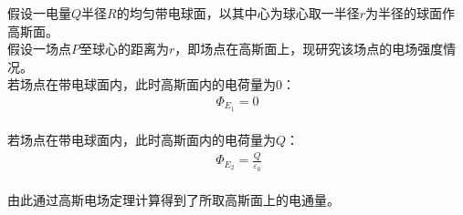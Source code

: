 \documentclass[UTF8]{ctexart}
\begin{document}
    假设一电量$Q$半径$R$的均匀带电球面，以其中心为球心取一半径$r$为半径的球面作高斯面。\\[3mm]
    假设一场点$P$至球心的距离为$r$，即场点在高斯面上，现研究该场点的电场强度情况。\\[6mm]
    若场点在带电球面内，此时高斯面内的电荷量为$0$：
    \begin{align}
        \Phi_{E_1}=0
    \end{align}\\
    若场点在带电球面内，此时高斯面内的电荷量为$Q$：\vspace{5pt}
    \begin{align}
        ~\Phi_{E_2}=\frac{Q}{\varepsilon_0}
    \end{align}\\
    由此通过高斯电场定理计算得到了所取高斯面上的电通量。

\newpage
\end{document}
